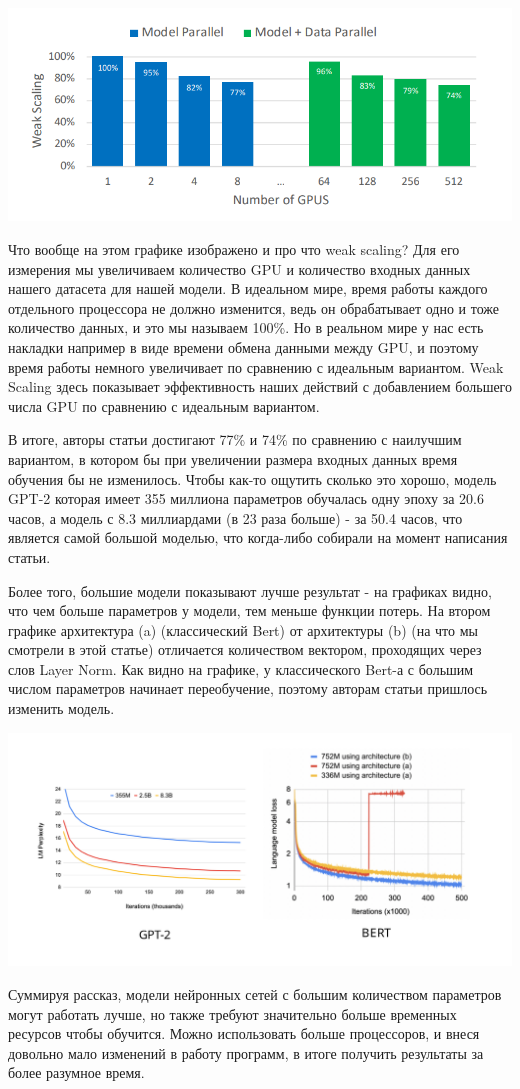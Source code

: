 \includegraphics[width=0.8\linewidth]{Parts/images/TP_weak_scaling.png}

Что вообще на этом графике изображено и про что weak scaling? Для его измерения мы увеличиваем количество GPU и количество входных данных нашего датасета для нашей модели. В идеальном мире, время работы каждого отдельного процессора не должно изменится, ведь он обрабатывает одно и тоже количество данных, и это мы называем 100\%. Но в реальном мире у нас есть накладки например в виде времени обмена данными между GPU, и поэтому время работы немного увеличивает по сравнению с идеальным вариантом. Weak Scaling здесь показывает эффективность наших действий с добавлением большего числа GPU по сравнению с идеальным вариантом.

В итоге, авторы статьи достигают 77\% и 74\% по сравнению с наилучшим вариантом, в котором бы при увеличении размера входных данных время обучения бы не изменилось. Чтобы как-то ощутить сколько это хорошо, модель GPT-2 которая имеет 355 миллиона параметров обучалась одну эпоху за 20.6 часов, а модель с 8.3 миллиардами (в 23 раза больше) - за 50.4 часов, что является самой большой моделью, что когда-либо собирали на момент написания статьи.

Более того, большие модели показывают лучше результат - на графиках видно, что чем больше параметров у модели, тем меньше функции потерь. На втором графике архитектура (a) (классический Bert) от архитектуры (b) (на что мы смотрели в этой статье) отличается количеством вектором, проходящих через слов Layer Norm. Как видно на графике, у классического Bert-а с большим числом параметров начинает переобучение, поэтому авторам статьи пришлось изменить модель.  

\includegraphics[width=0.8\linewidth]{Parts/images/TP_loss.png}

Суммируя рассказ, модели нейронных сетей с большим количеством параметров могут работать лучше, но также требуют значительно больше временных ресурсов чтобы обучится. Можно использовать больше процессоров, и внеся довольно мало изменений в работу программ, в итоге получить результаты за более разумное время.
